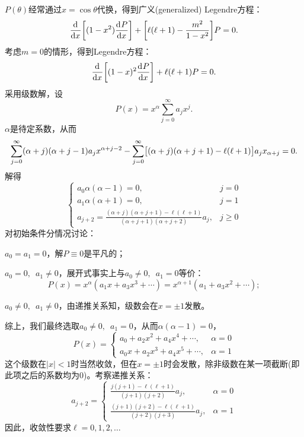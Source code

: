 $P(\theta)$经常通过$x=\cos\theta$代换，得到广义(generalized) Legendre方程：
\begin{equation}
    \label{eqn:general Legendre}
    \frac{\mathrm{d}^{{}}}{\mathrm{d}{x}^{{}}}\biggl[(1-x^2)\frac{\mathrm{d}^{{}}P}{\mathrm{d}{x}^{{}}}\biggr]+\biggl[\ell(\ell+1)-\frac{m^2}{1-x^2}\biggr]P=0.
\end{equation}
考虑$m=0$的情形，得到Legendre方程：
\begin{equation}
    \label{eqn:Legendre}
    \frac{\mathrm{d}^{{}}}{\mathrm{d}{x}^{{}}}\biggl[(1-x)^2\frac{\mathrm{d}^{{}}P}{\mathrm{d}{x}^{{}}}\biggr]+\ell(\ell+1)P=0.
\end{equation}
采用级数解，设
\[
    P(x)=x^\alpha\sum_{j=0}^\infty a_jx^j.
\]
$\alpha$是待定系数，从而 
\[
    \sum_{j=0}^\infty(\alpha+j)(\alpha+j-1)a_j x^{\alpha+j-2}-\sum_{j=0}^\infty\bigl[(\alpha+j)(\alpha+j+1)-\ell(\ell+1)\bigr]a_jx_{\alpha+j}=0.
\]
解得
\[
    \begin{cases}
        a_0\alpha(\alpha-1)=0,&j=0\\
        a_1\alpha(\alpha+1)=0,&j=1\\
        a_{j+2}=\frac{(\alpha+j)(\alpha+j+1)-\ell(\ell+1)}{(\alpha+j+1)(\alpha+j+2)}a_j,&j\geqslant 0
    \end{cases}
\]
对初始条件分情况讨论：
\begin{compactitem}
	\item $a_0=a_1=0$，解$P\equiv 0$是平凡的；
	\item $a_0=0,\enspace a_1\neq 0$，展开式事实上与$a_0\neq 0,\enspace a_1=0$等价：
	\[
        P(x)=x^\alpha(a_1x+a_3x^3+\cdots)=x^{\alpha+1}(a_1+a_3x^2+\cdots);
    \]
	\item $a_0\neq 0,\enspace a_1\neq 0$，由递推关系知，级数会在$x=\pm 1$发散。
\end{compactitem}
综上，我们最终选取$a_0\neq 0,\enspace a_1=0$，从而$\alpha(\alpha-1)=0$，
\[
    P(x)=\begin{cases}
        a_0+a_2x^2+a_4x^4+\cdots,&\alpha=0\\
        a_0x+a_2x^3+a_4x^5+\cdots,&\alpha=1
    \end{cases}
\]
这个级数在$|x|<1$时当然收敛，但在$x=\pm 1$时会发散，除非级数在某一项截断(即此项之后的系数均为0)。考察递推关系：
\[
    a_{j+2}=\begin{cases}
        \frac{j(j+1)-\ell(\ell+1)}{(j+1)(j+2)}a_j,&\alpha=0\\[2ex]
        \frac{(j+1)(j+2)-\ell(\ell+1)}{(j+2)(j+3)}a_j,&\alpha=1
    \end{cases}
\]
因此，收敛性要求$\ell=0,1,2,\ldots$
